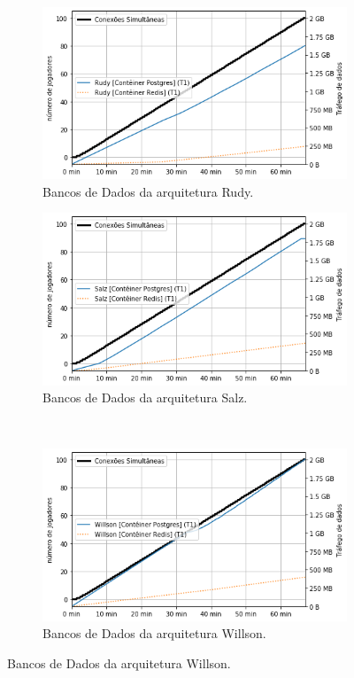\begin{figure}[htb!]
    \caption{Entrada de dados da rede dos bancos de dados.}
    \label{fig:experimento_db_net_in}

    \begin{subfigure}{0.5\textwidth}
        \centering
        \includegraphics[width=.95\linewidth]{figuras/analise/rt/r_net_in_db.png}
        \caption{Bancos de Dados da arquitetura Rudy.}
        \label{fig:r_netin_db}
    \end{subfigure}%
    \begin{subfigure}{0.5\textwidth}
        \centering
        \includegraphics[width=.95\linewidth]{figuras/analise/rt/s_net_in_db.png}
        \caption{Bancos de Dados da arquitetura Salz.}
        \label{fig:s_netin_db}
    \end{subfigure}\\

    \begin{subfigure}{0.5\textwidth}
        \centering
        \includegraphics[width=.95\linewidth]{figuras/analise/rt/w_net_in_db.png}
        \caption{Bancos de Dados da arquitetura Willson.}
        \label{fig:w_netin_db}
    \end{subfigure}


\end{figure}
